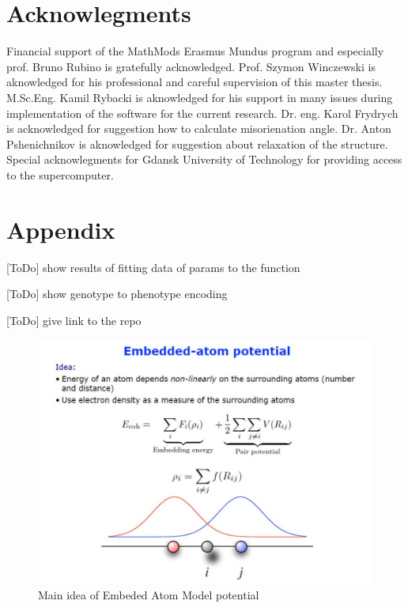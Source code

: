 \documentclass[12pt]{report}
\begin{document}
\section{Acknowlegments}

Financial support of the MathMods Erasmus Mundus program and especially prof. Bruno Rubino is gratefully acknowledged. Prof. Szymon Winczewski is aknowledged for his professional and careful supervision of this master thesis. M.Sc.Eng. Kamil Rybacki is aknowledged for his support in many issues during implementation of the software for the current research. Dr. eng. Karol Frydrych is acknowledged for suggestion how to calculate misorienation angle. Dr. Anton Pshenichnikov is aknowledged for suggestion about relaxation of the structure. Special acknowlegments for Gdansk University of Technology for providing access to the supercomputer.

\goodbreak
\section{Appendix}

[ToDo] show results of fitting data of params to the function

[ToDo] show genotype to phenotype encoding

[ToDo] give link to the repo

\begin{figure}
    \centering
    \includegraphics[width=5.0in]{EAM_appendix}
    \caption{Main idea of Embeded Atom Model potential}
    \label{eamappendix}
\end{figure}
\end{document}
